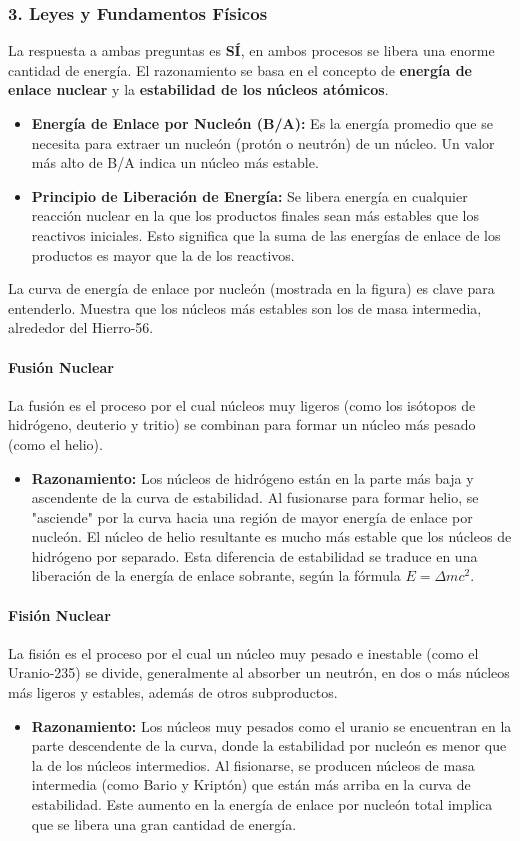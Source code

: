 \subsubsection*{3. Leyes y Fundamentos Físicos}
La respuesta a ambas preguntas es \textbf{SÍ}, en ambos procesos se libera una enorme cantidad de energía. El razonamiento se basa en el concepto de \textbf{energía de enlace nuclear} y la \textbf{estabilidad de los núcleos atómicos}.
\begin{itemize}
    \item \textbf{Energía de Enlace por Nucleón (B/A):} Es la energía promedio que se necesita para extraer un nucleón (protón o neutrón) de un núcleo. Un valor más alto de B/A indica un núcleo más estable.
    \item \textbf{Principio de Liberación de Energía:} Se libera energía en cualquier reacción nuclear en la que los productos finales sean más estables que los reactivos iniciales. Esto significa que la suma de las energías de enlace de los productos es mayor que la de los reactivos.
\end{itemize}
La curva de energía de enlace por nucleón (mostrada en la figura) es clave para entenderlo. Muestra que los núcleos más estables son los de masa intermedia, alrededor del Hierro-56.

\paragraph{Fusión Nuclear}
La fusión es el proceso por el cual núcleos muy ligeros (como los isótopos de hidrógeno, deuterio y tritio) se combinan para formar un núcleo más pesado (como el helio).
\begin{itemize}
    \item \textbf{Razonamiento:} Los núcleos de hidrógeno están en la parte más baja y ascendente de la curva de estabilidad. Al fusionarse para formar helio, se "asciende" por la curva hacia una región de mayor energía de enlace por nucleón. El núcleo de helio resultante es mucho más estable que los núcleos de hidrógeno por separado. Esta diferencia de estabilidad se traduce en una liberación de la energía de enlace sobrante, según la fórmula $E=\Delta m c^2$.
\end{itemize}

\paragraph{Fisión Nuclear}
La fisión es el proceso por el cual un núcleo muy pesado e inestable (como el Uranio-235) se divide, generalmente al absorber un neutrón, en dos o más núcleos más ligeros y estables, además de otros subproductos.
\begin{itemize}
    \item \textbf{Razonamiento:} Los núcleos muy pesados como el uranio se encuentran en la parte descendente de la curva, donde la estabilidad por nucleón es menor que la de los núcleos intermedios. Al fisionarse, se producen núcleos de masa intermedia (como Bario y Kriptón) que están más arriba en la curva de estabilidad. Este aumento en la energía de enlace por nucleón total implica que se libera una gran cantidad de energía.
\end{itemize}


